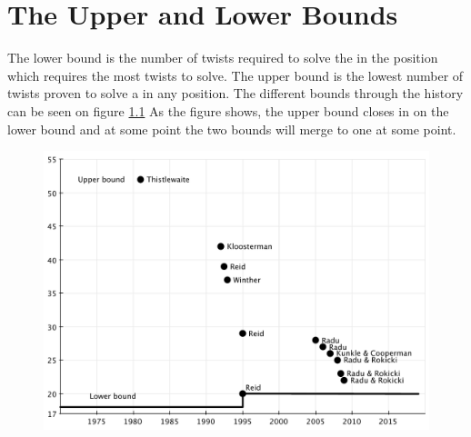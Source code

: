 \chapter{The Upper and Lower Bounds}

The lower bound is the number of twists required to solve the \rubik{} in the position which requires the most twists to solve.
The upper bound is the lowest number of twists proven to solve a \rubik{} in any position.
The different bounds through the history can be seen on figure \ref{fig:upperLowerBound}
As the figure shows, the upper bound closes in on the lower bound and at some point the two bounds will merge to one at some point.

\begin{figure}[ht]
	\centering
		\includegraphics[scale = 0.7]{input/pics/bounds2.pdf}
	\caption{}
	\label{fig:upperLowerBound}
\end{figure}




